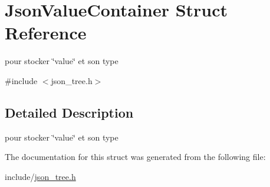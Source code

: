 \hypertarget{structJsonValueContainer}{}\section{Json\+Value\+Container Struct Reference}
\label{structJsonValueContainer}


pour stocker \char`\"{}value\char`\"{} et son type  




{\ttfamily \#include $<$json\+\_\+tree.\+h$>$}



\subsection{Detailed Description}
pour stocker \char`\"{}value\char`\"{} et son type 

The documentation for this struct was generated from the following file\+:\begin{DoxyCompactItemize}
\item 
include/\hyperlink{json__tree_8h}{json\+\_\+tree.\+h}\end{DoxyCompactItemize}
